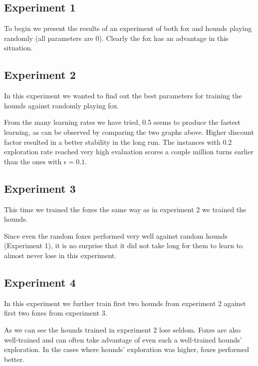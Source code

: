 \documentclass[a4paper]{article}
\begin{document}
\subsection{Experiment 1}
To begin we present the results of an experiment of both fox and hounds playing
randomly (all parameters are 0). Clearly the fox has an advantage in this
situation.



\subsection{Experiment 2}
In this experiment we wanted to find out the best parameters for training the
hounds against randomly playing fox.





From the many learning rates we have tried, 0.5 seems to produce the fastest
learning, as can be observed by comparing the two graphs above. Higher
discount factor resulted in a better stability in the long run. The instances
with $0.2$ exploration rate reached very high evaluation scores a couple
million turns earlier than the ones with $\epsilon = 0.1$.

\subsection{Experiment 3}
This time we trained the foxes the same way as in experiment 2 we trained the
hounds.





Since even the random foxes performed very well against random hounds
(Experiment 1), it is no surprise that it did not take long for them to learn
to almost never lose in this experiment.

\subsection{Experiment 4}
In this experiment we further train first two hounds from experiment 2 against
first two foxes from experiment 3.









As we can see the hounds trained in experiment 2 lose seldom. Foxes are also
well-trained and can often take advantage of even such a well-trained hounds'
exploration. In the cases where hounds' exploration was higher, foxes performed
better.
\end{document}
